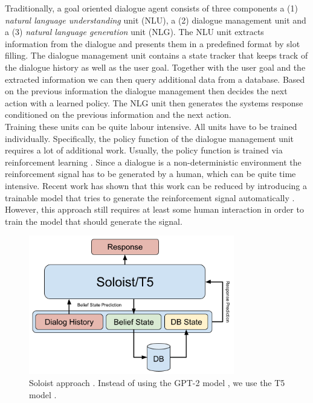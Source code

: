 \documentclass[twocolumn]{tum-article}
\begin{document}
Traditionally, a goal oriented dialogue agent consists of three components a (1) \textit{natural language understanding} unit (NLU), a (2) dialogue management unit and a (3) \textit{natural language generation} unit (NLG). The NLU unit extracts information from the dialogue and presents them in a predefined format by slot filling. The dialogue management unit contains a state tracker that keeps track of the dialogue history as well as the user goal. Together with the user goal and the extracted information we can then query additional data from a database. Based on the previous information the dialogue management then decides the next action with a learned policy. The NLG unit then generates the systems response conditioned on the previous information and the next action.\\
Training these units can be quite labour intensive. All units have to be trained individually. Specifically, the policy function of the dialogue management unit requires a lot of additional work. Usually, the policy function is trained via reinforcement learning \cite{DBLP:journals/ml/Williams92}. Since a dialogue is a non-deterministic environment the reinforcement signal has to be generated by a human, which can be quite time intensive. Recent work has shown that this work can be reduced by introducing a trainable model that tries to generate the reinforcement signal automatically \cite{DBLP:journals/corr/abs-1907-00448}. However, this approach still requires at least some human interaction in order to train the model that should generate the signal.\\
\begin{figure}[!h]
\centering
\includegraphics[width=0.8\textwidth]{figures/Soloist.png}
\caption{Soloist approach \cite{peng2020soloist}. Instead of using the GPT-2 model \cite{radford2019language}, we use the T5 model \cite{raffel2019exploring}.}
\label{fig:soloist}
\end{figure}
\end{document}
